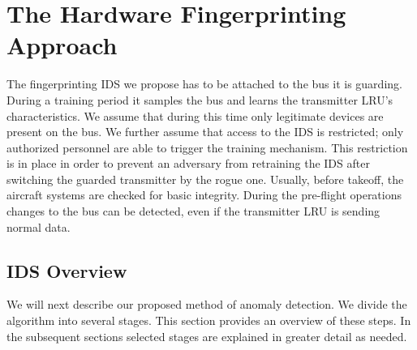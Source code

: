 \documentclass[english]{llncs}
\newcommand{\level}[1]{\section{#1}}
\newcommand{\sublevel}[1]{\subsection{#1}}
\newcommand{\level}[1]{\chapter{#1}}
\newcommand{\sublevel}[1]{\section{#1}}
\begin{document}
\vspace*{-2ex} %
\level{The Hardware Fingerprinting Approach} \label{Approach}
\vspace*{-1ex} %
  The fingerprinting IDS we propose has to be attached to the bus it is guarding. During a training period it samples the bus and learns the transmitter LRU's characteristics. We assume that during this time only legitimate devices are present on the bus. We further assume that access to the IDS is restricted;
  only authorized personnel are able to trigger the training mechanism. This restriction is in place in order to prevent an adversary from retraining the IDS after switching the guarded transmitter by the rogue one. Usually, before takeoff, the aircraft systems are checked for basic integrity.
  During the pre-flight operations changes to the bus can be detected, even if the transmitter LRU is sending normal data.

\vspace*{-2ex} %
\sublevel{IDS Overview} \label{Overview}
\vspace*{-1ex} %
  We will next describe our proposed method of anomaly detection. We divide the algorithm into several stages. This section provides an overview of these steps. In the subsequent sections selected stages are explained in greater detail as needed.
  
\end{document}
